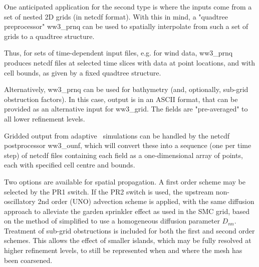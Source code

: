 One anticipated application for the second type is where the inputs 
come from a set of nested 2D grids (in netcdf format). 
With this in mind, a "quadtree preprocessor" 
{\code ww3\_prnq} can be used to spatially interpolate from such a set of 
grids to a quadtree structure. 

Thus, for sets of time-dependent input files, e.g. for wind data,
{\code ww3\_prnq} produces netcdf files at selected time slices with data 
at point locations, and with cell bounds, as given by a fixed quadtree 
structure.

Alternatively, {\code ww3\_prnq} can be used for bathymetry (and, 
optionally, sub-grid obstruction factors).
In this case, output is in an ASCII format, that can be provided as 
an alternative input for {\code ww3\_grid}. The fields are
"pre-averaged" to all lower refinement levels. 

Gridded output from adaptive \ws\ simulations can be handled by 
the netcdf postprocessor {\code ww3\_ounf}, which will 
convert these into a sequence (one per time step) of netcdf files containing 
each field as a one-dimensional array of points, each with specified cell 
centre and bounds.

Two options are available for spatial propagation. A first order scheme 
may be selected by the {\code PR1} switch. If the {\code PR2} switch is used, 
the upstream non-oscillatory 2nd order (UNO) advection scheme \citep{art:Li08} 
is applied, with the same diffusion approach to alleviate the garden 
sprinkler effect as used in the SMC grid, based on the method of 
\cite{art:BH87}simplified to use a homogeneous diffusion parameter $D_{nn}$. 
Treatment of sub-grid obstructions is included for both the first and 
second order schemes. 
This allows the effect of smaller islands, which may be fully 
resolved at higher refinement levels, to still be represented when and 
where the mesh has been coarsened.


